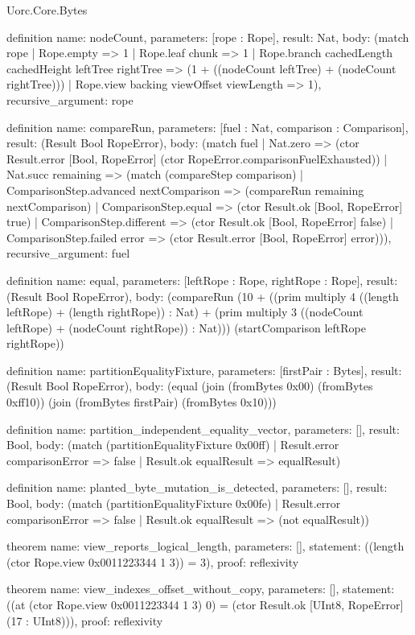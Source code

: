 \begin{lexlean}{Uorc.Core.Bytes}
\begin{semanticmodule}
definition{
  name: nodeCount,
  parameters: [rope : Rope],
  result: Nat,
  body: (match rope
    | Rope.empty => 1
    | Rope.leaf chunk => 1
    | Rope.branch cachedLength cachedHeight leftTree rightTree => (1 + ((nodeCount leftTree) + (nodeCount rightTree)))
    | Rope.view backing viewOffset viewLength => 1),
  recursive_argument: rope
}

definition{
  name: compareRun,
  parameters: [fuel : Nat, comparison : Comparison],
  result: (Result Bool RopeError),
  body: (match fuel
    | Nat.zero => (ctor Result.error [Bool, RopeError] (ctor RopeError.comparisonFuelExhausted))
    | Nat.succ remaining => (match (compareStep comparison)
      | ComparisonStep.advanced nextComparison => (compareRun remaining nextComparison)
      | ComparisonStep.equal => (ctor Result.ok [Bool, RopeError] true)
      | ComparisonStep.different => (ctor Result.ok [Bool, RopeError] false)
      | ComparisonStep.failed error => (ctor Result.error [Bool, RopeError] error))),
  recursive_argument: fuel
}

definition{
  name: equal,
  parameters: [leftRope : Rope, rightRope : Rope],
  result: (Result Bool RopeError),
  body: (compareRun (10 + ((prim multiply 4 ((length leftRope) + (length rightRope)) : Nat) + (prim multiply 3 ((nodeCount leftRope) + (nodeCount rightRope)) : Nat))) (startComparison leftRope rightRope))
}

definition{
  name: partitionEqualityFixture,
  parameters: [firstPair : Bytes],
  result: (Result Bool RopeError),
  body: (equal (join (fromBytes 0x00) (fromBytes 0xff10)) (join (fromBytes firstPair) (fromBytes 0x10)))
}

definition{
  name: partition_independent_equality_vector,
  parameters: [],
  result: Bool,
  body: (match (partitionEqualityFixture 0x00ff)
    | Result.error comparisonError => false
    | Result.ok equalResult => equalResult)
}

definition{
  name: planted_byte_mutation_is_detected,
  parameters: [],
  result: Bool,
  body: (match (partitionEqualityFixture 0x00fe)
    | Result.error comparisonError => false
    | Result.ok equalResult => (not equalResult))
}

theorem{
  name: view_reports_logical_length,
  parameters: [],
  statement: ((length (ctor Rope.view 0x0011223344 1 3)) = 3),
  proof: reflexivity{}
}

theorem{
  name: view_indexes_offset_without_copy,
  parameters: [],
  statement: ((at (ctor Rope.view 0x0011223344 1 3) 0) = (ctor Result.ok [UInt8, RopeError] (17 : UInt8))),
  proof: reflexivity{}
}


\end{semanticmodule}
\end{lexlean}
